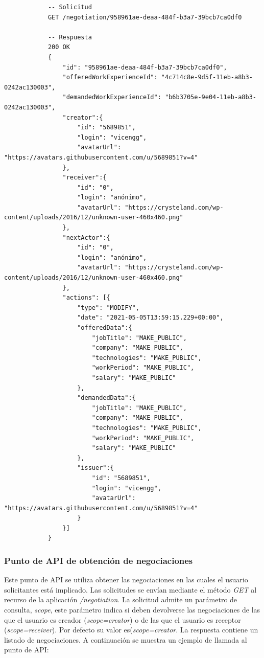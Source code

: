 \documentclass[a4paper, 12pt]{book}
\begin{document}
        {\scriptsize
    \linespread{1}
    \begin{verbatim}
			-- Solicitud
			GET /negotiation/958961ae-deaa-484f-b3a7-39bcb7ca0df0

			-- Respuesta
			200 OK
			{
			    "id": "958961ae-deaa-484f-b3a7-39bcb7ca0df0",
			    "offeredWorkExperienceId": "4c714c8e-9d5f-11eb-a8b3-0242ac130003",
			    "demandedWorkExperienceId": "b6b3705e-9e04-11eb-a8b3-0242ac130003",
			    "creator":{
			        "id": "5689851",
			        "login": "vicengg",
			        "avatarUrl": "https://avatars.githubusercontent.com/u/5689851?v=4"
			    },
			    "receiver":{
			        "id": "0",
			        "login": "anónimo",
			        "avatarUrl": "https://crysteland.com/wp-content/uploads/2016/12/unknown-user-460x460.png"
			    },
			    "nextActor":{
			        "id": "0",
			        "login": "anónimo",
			        "avatarUrl": "https://crysteland.com/wp-content/uploads/2016/12/unknown-user-460x460.png"
			    },
			    "actions": [{
			        "type": "MODIFY",
			        "date": "2021-05-05T13:59:15.229+00:00",
			        "offeredData":{
			            "jobTitle": "MAKE_PUBLIC",
			            "company": "MAKE_PUBLIC",
			            "technologies": "MAKE_PUBLIC",
			            "workPeriod": "MAKE_PUBLIC",
			            "salary": "MAKE_PUBLIC"
			        },
			        "demandedData":{
			            "jobTitle": "MAKE_PUBLIC",
			            "company": "MAKE_PUBLIC",
			            "technologies": "MAKE_PUBLIC",
			            "workPeriod": "MAKE_PUBLIC",
			            "salary": "MAKE_PUBLIC"
			        },
			        "issuer":{
			            "id": "5689851",
			            "login": "vicengg",
			            "avatarUrl": "https://avatars.githubusercontent.com/u/5689851?v=4"
			        }
			    }]
			}
    \end{verbatim}
    }

    \subsubsection{Punto de API de obtención de negociaciones}
    \label{subsec:get_negotiation}
    Este punto de API se utiliza obtener las negociaciones en las cuales el usuario solicitantes está implicado.
    Las solicitudes se envían mediante el método \emph{GET} al recurso de la aplicación \emph{/negotiation}.
    La solicitud admite un parámetro de consulta, \emph{scope},
    este parámetro indica si deben devolverse las negociaciones de las que el usuario es creador (\emph{scope=creator}) o de las que el usuario es receptor (\emph{scope=receiver}).
    Por defecto su valor es(\emph{scope=creator}.
    La respuesta contiene un listado de negociaciones.
    A continuación se muestra un ejemplo de llamada al punto de API:
\end{document}
